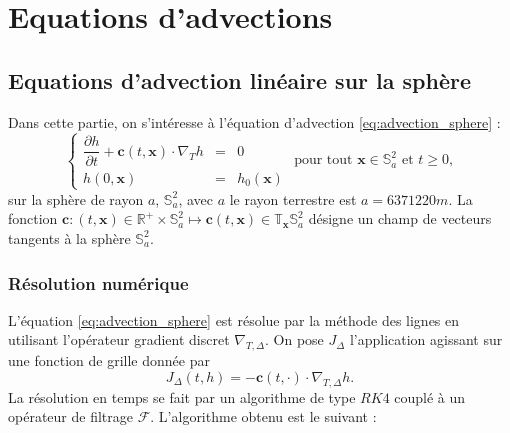 
\chapter{Equations d'advections}
\label{chap:advection}

\section{Equations d'advection linéaire sur la sphère}

Dans cette partie, on s'intéresse à l'équation d'advection \eqref{eq:advection_sphere} :
\begin{equation}
\left\lbrace
\begin{array}{rcl}
\dfrac{\partial h}{\partial t} + \mathbf{c}(t,\mathbf{x}) \cdot \nabla_T h & = & 0 \\
h(0,\mathbf{x}) & = & h_0(\mathbf{x})
\end{array}
\right. \text{ pour tout } \mathbf{x} \in \mathbb{S}_a^2 \text{ et } t \geq 0,
\label{eq:advection_sphere}
\end{equation}
sur la sphère de rayon $a$, $\mathbb{S}_a^2$, avec $a$ le rayon terrestre est $a = 6 371 220 \si{m}$.
La fonction $\mathbf{c} : (t,\mathbf{x}) \in \mathbb{R}^+ \times \mathbb{S}_a^2 \mapsto \mathbf{c}(t,\mathbf{x}) \in \mathbb{T}_{\mathbf{x}} \mathbb{S}_a^2$ désigne un champ de vecteurs tangents à la sphère $\mathbb{S}_a^2$.

\subsection{Résolution numérique}

L'équation \eqref{eq:advection_sphere} est résolue par la méthode des lignes en utilisant l'opérateur gradient discret $\nabla_{T,\Delta}$. On pose $J_{\Delta}$ l'application agissant sur une fonction de grille donnée par
\begin{equation}
J_{\Delta}(t, h) = - \mathbf{c}(t,\cdot) \cdot \nabla_{T,\Delta} h.
\end{equation}
La résolution en temps se fait par un algorithme de type $RK4$ couplé à un opérateur de filtrage $\mathcal{F}$. L'algorithme obtenu est le suivant :

